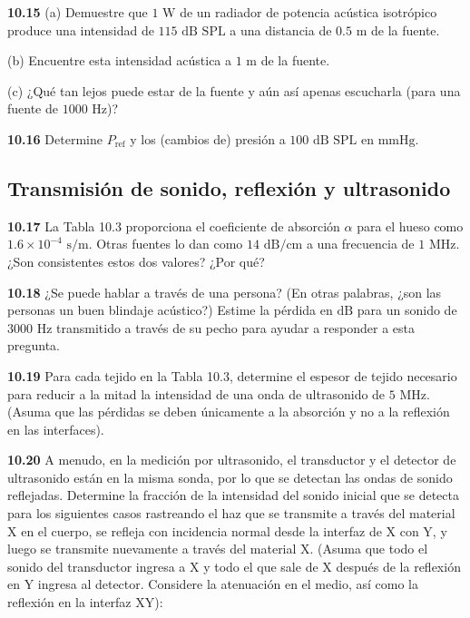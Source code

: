 \documentclass[12pt]{book}
\begin{document}
\noindent \textbf{10.15} (a) Demuestre que $1\text{ W}$ de un radiador de potencia acústica isotrópico produce una intensidad de $115\text{ dB SPL}$ a una distancia de $0.5\text{ m}$ de la fuente.

(b) Encuentre esta intensidad acústica a $1\text{ m}$ de la fuente.

(c) ¿Qué tan lejos puede estar de la fuente y aún así apenas escucharla (para una fuente de $1000\text{ Hz}$)?

\noindent \textbf{10.16} Determine $P_{\text{ref}}$ y los (cambios de) presión a $100\text{ dB SPL}$ en $\text{mmHg}$.

\subsection*{Transmisión de sonido, reflexión y ultrasonido}

\noindent \textbf{10.17} La Tabla 10.3 proporciona el coeficiente de absorción $\alpha$ para el hueso como $1.6 \times 10^{-4}\text{ s/m}$. Otras fuentes lo dan como $14\text{ dB/cm}$ a una frecuencia de $1\text{ MHz}$. ¿Son consistentes estos dos valores? ¿Por qué?

\noindent \textbf{10.18} ¿Se puede hablar a través de una persona? (En otras palabras, ¿son las personas un buen blindaje acústico?) Estime la pérdida en $\text{dB}$ para un sonido de $3000\text{ Hz}$ transmitido a través de su pecho para ayudar a responder a esta pregunta.

\noindent \textbf{10.19} Para cada tejido en la Tabla 10.3, determine el espesor de tejido necesario para reducir a la mitad la intensidad de una onda de ultrasonido de $5\text{ MHz}$. (Asuma que las pérdidas se deben únicamente a la absorción y no a la reflexión en las interfaces).

\noindent \textbf{10.20} A menudo, en la medición por ultrasonido, el transductor y el detector de ultrasonido están en la misma sonda, por lo que se detectan las ondas de sonido reflejadas. Determine la fracción de la intensidad del sonido inicial que se detecta para los siguientes casos rastreando el haz que se transmite a través del material X en el cuerpo, se refleja con incidencia normal desde la interfaz de X con Y, y luego se transmite nuevamente a través del material X. (Asuma que todo el sonido del transductor ingresa a X y todo el que sale de X después de la reflexión en Y ingresa al detector. Considere la atenuación en el medio, así como la reflexión en la interfaz X\text{--}Y):
\end{document}
